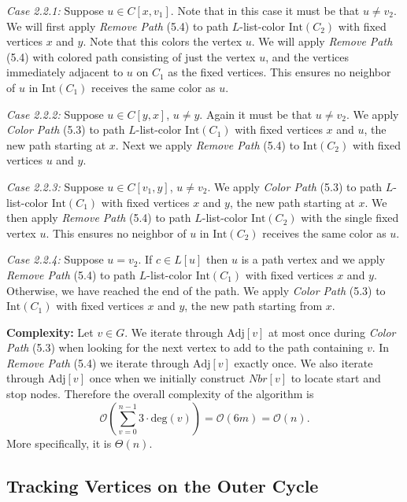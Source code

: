 \documentclass[letterpaper, 12pt]{article}
\theoremstyle{thm}
\begin{document}
\textit{Case 2.2.1:} Suppose $u\in C[x,v_1]$. Note that in this case it must be that
$u\ne v_2$. We will first apply \textit{Remove Path} (5.4) to path $L$-list-color
$\text{Int}(C_2)$ with fixed vertices $x$ and $y$. Note that this colors the vertex
$u$. We will apply \textit{Remove Path} (5.4) with colored path consisting of
just the vertex $u$, and the vertices immediately adjacent to $u$ on $C_1$ as
the fixed vertices. This ensures no neighbor of $u$ in
$\text{Int}(C_1)$ receives the same color as $u$. 

\textit{Case 2.2.2:} Suppose $u\in C[y,x]$, $u\ne y$. Again it must be that
$u\ne v_2$. We apply \textit{Color Path} (5.3) to path $L$-list-color
$\text{Int}(C_1)$ with fixed vertices $x$ and $u$, the new path starting at $x$.
Next we apply \textit{Remove Path} (5.4) to $\text{Int}(C_2)$ with fixed
vertices $u$ and $y$.

\textit{Case 2.2.3:} Suppose $u\in C[v_1,y]$, $u\ne v_2$. We apply
\textit{Color Path} (5.3) to path $L$-list-color $\text{Int}(C_1)$ with fixed
vertices $x$ and $y$, the new path starting at $x$. We then apply \textit{Remove
Path} (5.4) to path $L$-list-color $\text{Int}(C_2)$ with the single fixed 
vertex $u$. This ensures no neighbor of $u$ in
$\text{Int}(C_2)$ receives the same color as $u$.

\textit{Case 2.2.4:} Suppose $u= v_2$. If $c\in L[u]$ then $u$ is a path vertex
and we apply \textit{Remove Path} (5.4) to path $L$-list-color $\text{Int}(C_1)$
with fixed vertices $x$ and $y$. Otherwise, we have reached the end of the path.
We apply \textit{Color Path} (5.3) to $\text{Int}(C_1)$ with fixed vertices $x$
and $y$, the new path starting from $x$.

\noindent\textbf{Complexity:} Let $v\in G$. We iterate through $\text{Adj}[v]$
at most once during \textit{Color Path} (5.3) when looking for the next vertex
to add to the path containing $v$. In \textit{Remove Path} (5.4) we iterate through
$\text{Adj}[v]$ exactly once. We also iterate through $\text{Adj}[v]$ once
when we initially construct $\textit{Nbr}[v]$ to locate start and stop nodes.
Therefore the overall complexity of the algorithm is
\[
    \mathcal{O}\left(\sum_{v=0}^{n-1}3\cdot\text{deg}(v)\right)
        =\mathcal{O}(6m)=\mathcal{O}(n).
\]
More specifically, it is $\Theta(n)$.

\subsection{Tracking Vertices on the Outer Cycle}
\end{document}
